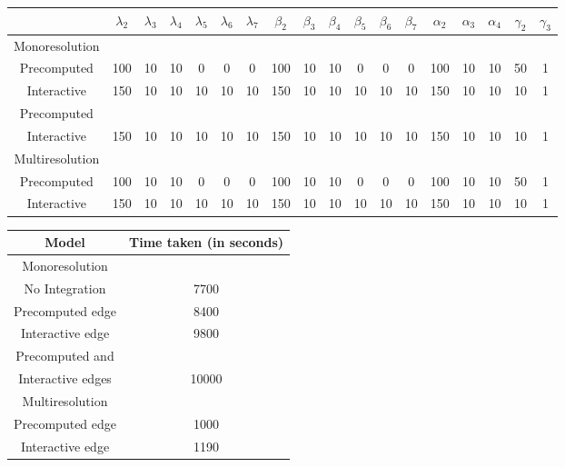 {\newpage
\clearpage
\samepage \begin{table}%
[h]
\begin{center}
\begin{tabular}{|c|c|c|c|c|c|c|c|c|c|c|c|c|c|c|c|c|c|} \hline
                 &   $\lambda_2$ & $\lambda_3$ & $\lambda_4$& $\lambda_5$ & $\lambda_6$ &$\lambda_7$ &
                    $\beta_2$ & $\beta_3$ & $\beta_4$& $\beta_5$ & $\beta_6$ &$\beta_7$ &
                   $\alpha_2$ & $\alpha_3$ & $\alpha_4$ &
                   $\gamma_2$ & $\gamma_3$ \\  \hline 
Monoresolution & && &&&&&& &&&&&&&&\\  \cline{1-1}
Precomputed  & 100 & 10 & 10 & 0 & 0 & 0 & 100 & 10 &10 & 0 & 0 & 0 & 100 & 10 & 10 & 50 & 1\\ 
Interactive  &150&10&10&10&10&10&150 &10&10 &10&10&10&150&10&10&10 &1\\ 
Precomputed   &&&&&&& && &&&&&&&&\\ 
Interactive  &150&10&10&10&10&10&150 &10&10 &10&10&10&150&10&10&10 &1\\  \hline
Multiresolution &&&&&&& && &&&&&&&& \\  \cline{1-1}
Precomputed  & 100 & 10 & 10 & 0 & 0 & 0 & 100 & 10 &10 & 0 & 0 & 0 & 100 & 10 & 10 & 50 & 1\\ 
Interactive  &150&10&10&10&10&10&150 &10&10 &10&10&10&150&10&10&10 &1\\  \hline
\end{tabular}
\end{center}

\end{table}
}

{\newpage
\clearpage
\samepage \begin{table}[h]
\begin{center}
\begin{tabular}{|c|c|} \hline
Model & Time taken (in seconds)          \\   \hline 
Monoresolution &              \\  \cline{1-1}
No Integration   & 7700           \\ 
Precomputed edge & 8400           \\ 
Interactive edge & 9800           \\ 
Precomputed and &             \\ 
Interactive edges &10000           \\  \hline
Multiresolution &             \\  \cline{1-1}
Precomputed edge & 1000           \\ 
Interactive edge & 1190           \\  \hline
\end{tabular}
\end{center}

\end{table}
}



